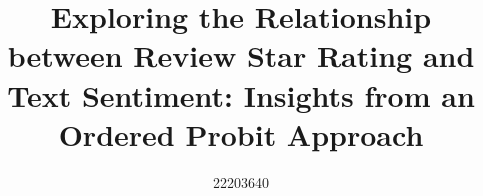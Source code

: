 \documentclass[sn-mathphys,Numbered]{sn-jnl}%
\theoremstyle{thmstyleone}%
\theoremstyle{thmstyletwo}%
\theoremstyle{thmstylethree}%
\begin{document}
\title{Exploring the Relationship between Review Star Rating and Text Sentiment: Insights from an Ordered Probit Approach}

\subtitle{22203640}


\author{ }




\end{document}
